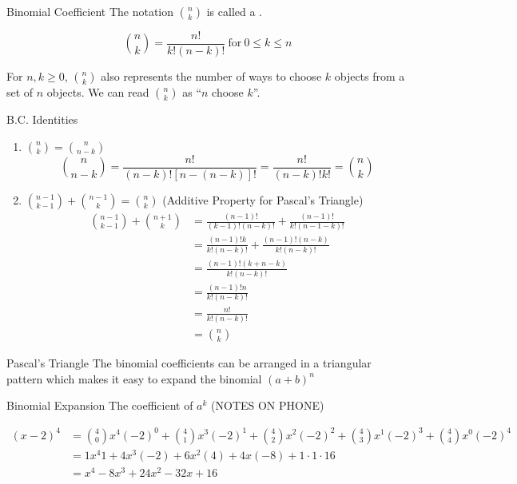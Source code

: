 \documentclass[letterpaper,12pt]{report}
\begin{document}
\begin{dfnbox}{Binomial Coefficient}{}
	The notation $n \choose k$ is called a .

	$${n \choose k} = \frac{n!}{k!(n-k)!}\ \text{for}\ 0 \leq k \leq n$$
\end{dfnbox}

For $n, k \geq 0$, ${n \choose k}$ also represents the number of ways to choose $k$ objects from a set of $n$ objects. We can read ${n \choose k}$ as ``$n$ choose $k$''.

\begin{exbox}{B.C. Identities}{}
\begin{enumerate}
	\item ${n \choose k} = {n \choose n-k}$
	$${n \choose n-k} = \frac{n!}{(n-k)! \left[ n - (n-k) \right]!} = \frac{n!}{(n-k)!k!} = {n \choose k}$$

	\item ${n-1 \choose k-1} + {n-1 \choose k} = {n \choose k}$ (Additive Property for Pascal's Triangle)
	\begin{align*}
		{n-1 \choose k-1} + {n+1 \choose k} &= \frac{(n-1)!}{(k-1)! (n-k)!} + \frac{(n-1)!}{k!(n-1-k)!} \\
		&= \frac{(n-1)!k}{k!(n-k)!} + \frac{(n-1)!(n-k)}{k!(n-k)!} \\
		&= \frac{(n-1)! (k+n-k)}{k!(n-k)!} \\
		&= \frac{(n-1)!n}{k!(n-k)!} \\
		&= \frac{n!}{k!(n-k)!} \\
		&= {n \choose k}
	\end{align*}
\end{enumerate}
\end{exbox}

\begin{dfnbox}{Pascal's Triangle}{}
	The binomial coefficients can be arranged in a triangular pattern which makes it easy to expand the binomial $(a+b)^n$
\end{dfnbox}

\begin{exbox}{Binomial Expansion}{}
	The coefficient of $a^k$ (NOTES ON PHONE)

	\begin{align*}
		(x-2)^4 &= {4 \choose 0} x^4 (-2)^0 + {4 \choose 1} x^3 (-2)^1 + {4 \choose 2} x^2(-2)^2 + {4 \choose 3} x^1 (-2)^3 + {4 \choose 4}x^0 (-2)^4 \\
		&= 1 x^4 1 + 4 x^3 (-2) + 6 x^2 (4) + 4 x(-8) + 1 \cdot 1 \cdot 16 \\
		&= x^4 - 8x^3 + 24x^2 - 32x + 16
	\end{align*}
\end{exbox}
\end{document}
